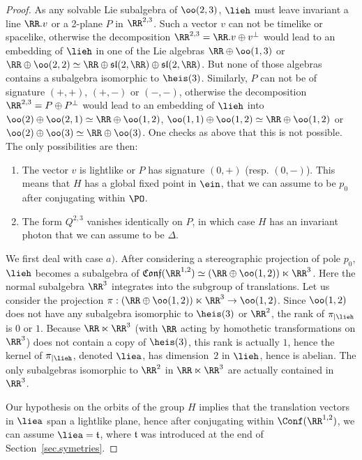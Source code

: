 \begin{proof}
As any solvable Lie subalgebra of $\oo(2,3)$, $\lieh$ must leave invariant a line $\RR.v$ or a 2-plane $P$ in $\RR^{2,3}$. Such a vector $v$ can not be timelike or spacelike, otherwise the decomposition $\RR^{2,3}=\RR.v \oplus v^{\perp}$ would lead to an embedding of $\lieh$ in one of the Lie algebras $\RR \oplus \oo(1,3)$ or $\RR \oplus \oo(2,2) \simeq \RR \oplus \mathfrak{sl}(2,\RR) \oplus \mathfrak{sl}(2,\RR)$. But none of those algebras contains a subalgebra isomorphic to $\heis(3)$. Similarly, $P$ can not be of signature $(+,+)$, $(+,-)$ or $(-,-)$, otherwise the decomposition $\RR^{2,3}=P \oplus P^{\perp}$ would lead to an embedding of $\lieh$ into $\oo(2) \oplus \oo(2,1) \simeq \RR \oplus \oo(1,2)$, $\oo(1,1) \oplus \oo(1,2) \simeq \RR \oplus \oo(1,2)$ or $\oo(2) \oplus \oo(3) \simeq \RR \oplus \oo(3)$. One checks as above that this is not possible. The only possibilities are then:
\begin{enumerate}\alphenumi
\item \label{7.3.1}The vector $v$ is lightlike or $P$ has signature $(0,+)$ (resp. $(0,-)$). This means that $H$ has a global fixed point in $\ein$, that we can assume to be $p_0$ after conjugating within $\PO$.
\item \label{7.3.2}The form $Q^{2,3}$ vanishes identically on $P$, in which case $H$ has an invariant photon that we can assume to be $\Delta$.
\end{enumerate}



We first deal with case $a)$. After considering a stereographic projection of pole $p_0$, $\lieh$ becomes a subalgebra of $\mathfrak{Conf}(\RR^{1,2}) \simeq (\RR \oplus \oo(1,2)) \ltimes \RR^3$. Here the normal subalgebra $\RR^3$ integrates into the subgroup of translations. Let us consider the projection $\pi: (\RR \oplus \oo(1,2)) \ltimes \RR^3 \to \oo(1,2)$. Since $\oo(1,2)$ does not have any subalgebra isomorphic to $\heis(3)$ or $\RR^2$, the rank of $\pi_{|\lieh}$ is $0$ or $1$. Because $\RR \ltimes \RR^3$ (with $\RR$ acting by homothetic transformations on $\RR^3$) does not contain a copy of $\heis(3)$, this rank is actually $1$, hence the kernel of $\pi_{|\lieh}$, denoted $\liea$, has dimension~$2$ in $\lieh$, hence is abelian. The only subalgebras isomorphic to $\RR^2$ in $\RR \ltimes \RR^3$ are actually contained in $\RR^3$.

Our hypothesis on the orbits of the group $H$ implies that the translation vectors in $\liea$ span a lightlike plane, hence after conjugating within $\Conf(\RR^{1,2})$, we can assume $\liea=\mathfrak{t}$, where $\mathfrak{t}$ was introduced at the end of Section~\ref{sec.symetries}.



\end{proof}
